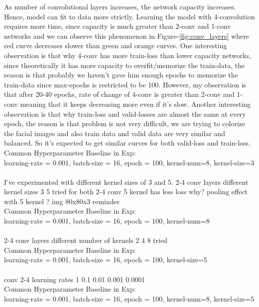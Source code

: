 \documentclass[12pt]{article}
\begin{document}
    \vspace*{0.5cm}
    \begin{center}
        \raggedright
        As number of convolutional layers increases, the network capacity increases. Hence, model can fit to data more strictly.
        Learning the model with 4-convolution requires more time, since capacity is much greater than 2-conv and 1-conv networks and we can observe this phenomenon in Figure-\ref*{fig:conv_layers}
        where red curve decreases slower than green and orange curves. One interesting observation is that why 4-conv has more train-loss than lower capacity networks, since theoretically it has more capacity
        to overfit/memorize the train-data, the reason is that probably we haven't gave him enough epochs to memorize the train-data since max-epochs is restricted to be 100. 
        However, my observation is that after 20-40 epochs, rate of change of 4-conv is greater than 2-conv and 1-conv meaning that 
        it keeps decreasing more even if it's slow. Another interesting observation is that why train-loss and valid-losses are almost the same at every epoch, the reason is that
        problem is not very difficult, we are trying to colorize the facial images and also train data and valid data are very similar and balanced.
        So it's expected to get similar curves for both valid-loss and train-loss.
        \\
        Common Hyperparameter Baseline in Exp: \\
        learning-rate = 0.001, batch-size = 16, epoch = 100, kernel-num=8, kernel-size=3
        \\~\\
        I've experimented with different kernel sizes of 3 and 5.
        2-4 conv layers different kernel sizes 3 5 tried
        for both 2-4 conv 5 kernel has less loss why? pooling effect with 5 kernel ?
        img 80x80x3 reminder
        \\
        Common Hyperparameter Baseline in Exp: \\
        learning-rate = 0.001, batch-size = 16, epoch = 100, kernel-num=8
        \\~\\
        2-4 conv layers different number of kernels 2 4 8 tried
        \\
        Common Hyperparameter Baseline in Exp: \\
        learning-rate = 0.001, batch-size = 16, epoch = 100, kernel-size=5
        \\~\\
        conv 2-4
        learning rates 1 0.1 0.01 0.001 0.0001
        \\
        Common Hyperparameter Baseline in Exp: \\
        learning-rate = 0.001, batch-size = 16, epoch = 100, kernel-num=8, kernel-size=5

    
    \end{center}
\end{document}
